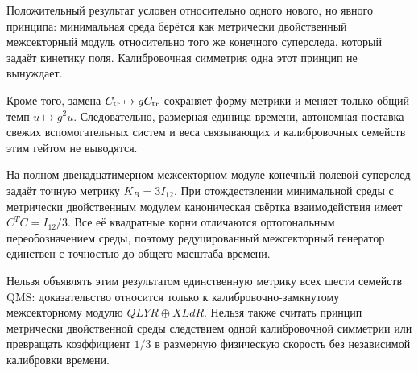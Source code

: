 Положительный результат условен относительно одного нового, но явного
принципа: минимальная среда берётся как метрически двойственный
межсекторный модуль относительно того же конечного суперследа, который задаёт
кинетику поля. Калибровочная симметрия одна этот принцип не вынуждает.

Кроме того, замена $C_{\rm tr}\mapsto gC_{\rm tr}$ сохраняет форму
метрики и меняет только общий темп $u\mapsto g^2u$. Следовательно,
размерная единица времени, автономная поставка свежих вспомогательных систем и веса
связывающих и калибровочных семейств этим гейтом не выводятся.

\begin{theorem}
На полном двенадцатимерном межсекторном модуле конечный полевой суперслед задаёт
точную метрику $K_B=3I_{12}$. При отождествлении минимальной среды с
метрически двойственным модулем каноническая свёртка взаимодействия имеет
$C^TC=I_{12}/3$. Все её квадратные корни отличаются ортогональным
переобозначением среды, поэтому редуцированный межсекторный генератор единствен с
точностью до общего масштаба времени.
\end{theorem}

\begin{nogocriterion}
Нельзя объявлять этим результатом единственную метрику всех шести семейств
QMS: доказательство относится только к калибровочно-замкнутому межсекторному модулю
$QLYR\oplus XLdR$. Нельзя также считать принцип метрически двойственной
среды следствием одной калибровочной симметрии или превращать коэффициент $1/3$ в
размерную физическую скорость без независимой калибровки времени.
\end{nogocriterion}


